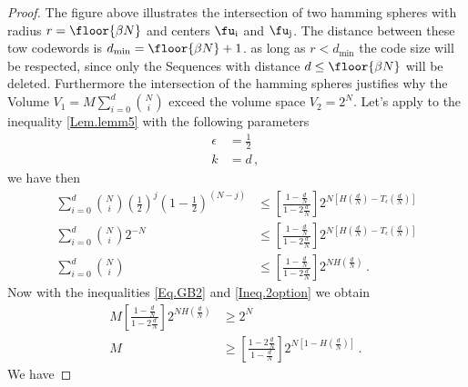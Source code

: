 \begin{proof}
The figure above  illustrates the intersection of two hamming spheres with radius $r=\floor{\beta N}$ and centers $\fu_{\text{i}}$ and $\fu_{\text{j}}$. The distance between these tow codewords is $d_{\text{min}}=\floor{\beta N}+1$. as long as $r < d_{\text{min}}$ the code size will be respected, since only the Sequences with distance $d \leq \floor{\beta N}$ will be deleted. Furthermore the intersection of the hamming spheres justifies why the Volume $V_1=  M \sum_{i=0}^{d} \binom{N}{i}$ exceed the volume space $V_2= 2^N$.\newline
Let's apply to the inequality \eqref{Lem.lemm5} with the following parameters
\begin{align}
    \epsilon&=\frac{1}{2}
    \nonumber\\
    k &= d \,,\,
\end{align}
we have then 
\begin{align}
    \label{Ineq.2option}
     \sum_{i=0}^{d} \binom{N}{i} (\frac{1}{2})^j (1-\frac{1}{2})^{(N-j)} &\leq \left[ \frac{1-\frac{d}{N}}{1-2\frac{d}{N}} \right] 2^{N\left[H(\frac{d}{N})-T_\epsilon(\frac{d}{N})\right]}
     \nonumber\\
     \sum_{i=0}^{d} \binom{N}{i} 2^{-N} &\leq \left[ \frac{1-\frac{d}{N}}{1-2\frac{d}{N}} \right] 2^{N\left[H(\frac{d}{N})-T_\epsilon(\frac{d}{N})\right]}
     \nonumber\\
     \sum_{i=0}^{d} \binom{N}{i} &\leq \left[ \frac{1-\frac{d}{N}}{1-2\frac{d}{N}} \right] 2^{N H(\frac{d}{N})} \,.\,
\end{align}
Now with the inequalities \eqref{Eq.GB2} and \eqref{Ineq.2option} we obtain 
\begin{align}
\label{ineq.2_solution}
    M \left[\frac{1-\frac{d}{N}}{1-2\frac{d}{N}} \right] 2^{N H(\frac{d}{N})} &\geq 2^N
    \nonumber\\
    M &\geq  \left[\frac{1-2\frac{d}{N}}{1-\frac{d}{N}} \right] 2^{N\left[1- H(\frac{d}{N})\right]} \,.\,
\end{align}
We have 

\end{proof}
